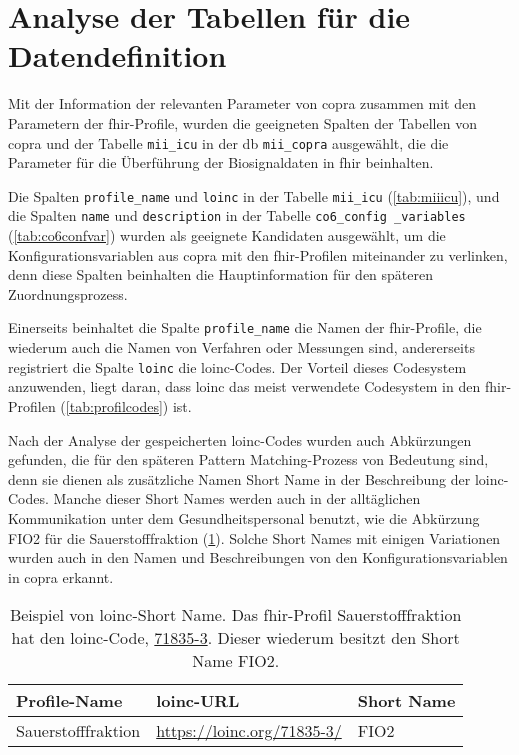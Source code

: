 \section{Analyse der Tabellen für die Datendefinition} \label{sec:analysiscolums}

Mit der Information der relevanten Parameter von \ac{copra} zusammen mit den Parametern der \ac{fhir}-Profile, wurden die geeigneten Spalten der Tabellen von \ac{copra} und der Tabelle \texttt{mii\_icu} in der \ac{db} \texttt{mii\_copra} ausgewählt, die die Parameter für die Überführung der Biosignaldaten in \ac{fhir} beinhalten.

Die Spalten \texttt{profile\_name} und \texttt{loinc} in der Tabelle \texttt{mii\_icu} (\ref{tab:miiicu}), und die Spalten \texttt{name} und \texttt{description} in der Tabelle \texttt{co6\_config \_variables} (\ref{tab:co6confvar}) wurden als geeignete Kandidaten ausgewählt, um die Konfigurationsvariablen aus \ac{copra} mit den \ac{fhir}-Profilen miteinander zu verlinken, denn diese Spalten beinhalten die Hauptinformation für den späteren Zuordnungsprozess.
 
 Einerseits beinhaltet die Spalte \texttt{profile\_name} die Namen der \ac{fhir}-Profile, die wiederum auch die Namen von Verfahren oder Messungen sind, andererseits registriert die Spalte \texttt{loinc} die \ac{loinc}-Codes. Der Vorteil dieses Codesystem anzuwenden, liegt daran, dass \ac{loinc} das meist verwendete Codesystem in den \ac{fhir}-Profilen (\ref{tab:profilcodes}) ist. 
 
 Nach der Analyse der gespeicherten \ac{loinc}-Codes wurden auch Abkürzungen gefunden, die für den späteren Pattern Matching-Prozess von Bedeutung sind, denn sie dienen als zusätzliche Namen \glqq Short Name\grqq{} in der Beschreibung der \ac{loinc}-Codes. Manche dieser \glqq Short Names\grqq{} werden auch in der alltäglichen Kommunikation unter dem Gesundheitspersonal benutzt, wie die Abkürzung FIO2 für die Sauerstofffraktion (\ref{tab:shortname}). Solche \glqq Short Names\grqq{} mit einigen Variationen wurden auch in den Namen und Beschreibungen von den Konfigurationsvariablen in \ac{copra} erkannt.

\begin{table}[ht]
	\centering 
	\caption[Beispiel von \acs{loinc}-\glqq Short Name\grqq{}]{Beispiel von \acs{loinc}-\glqq Short Name\grqq{}. Das \ac{fhir}-Profil \glqq Sauerstofffraktion\grqq{} hat den \ac{loinc}-Code, \href{https://loinc.org/71835-3/}{71835-3}. Dieser wiederum besitzt den \glqq Short Name\grqq{} FIO2.}
	\label{tab:shortname}
	\begin{tabular}{|p{4cm}|l|l|}
		\hline
		\bfseries Profile-Name & \bfseries \ac{loinc}-URL & \bfseries Short Name \\ \hline
		Sauerstofffraktion & \url{https://loinc.org/71835-3/} & 
		FIO2 \\ \hline 
	\end{tabular}
\end{table}

